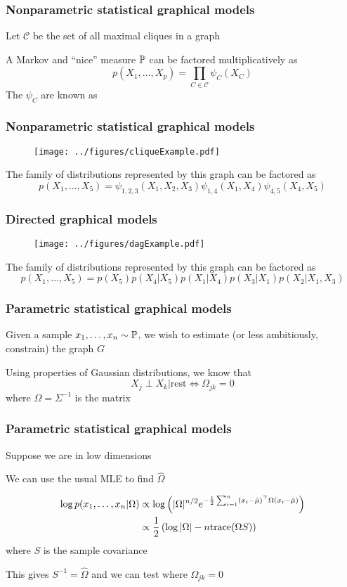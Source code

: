 \documentclass[12pt]{beamer}
\begin{document}
\begin{frame}[fragile]
\frametitle{Nonparametric statistical graphical models}
Let $\mathcal{C}$ be the set of all maximal cliques in a graph

\vsp
{} A Markov and ``nice'' measure $\P$ can be factored multiplicatively
as
\[
p(X_1,\ldots,X_p) = \prod_{C \in \mathcal{C}} \psi_C(X_C)
\]
The $\psi_C$ are known as 
\end{frame}

\begin{frame}[fragile]
\frametitle{Nonparametric statistical graphical models}
\begin{figure}
\centering
\texttt{[image: ../figures/cliqueExample.pdf]}
\end{figure}
The family of distributions represented by this graph can be factored as
\[
p(X_1,\ldots,X_5) = \psi_{1,2,3} (X_1,X_2,X_3)\psi_{1,4}(X_1,X_4)\psi_{4,5}(X_4,X_5)
\]
\end{frame}

\begin{frame}[fragile]
\frametitle{Directed graphical models}
\begin{figure}
\centering
\texttt{[image: ../figures/dagExample.pdf]}
\end{figure}
The family of distributions represented by this graph can be factored as
\[
p(X_1,\ldots,X_5) = p(X_5)p(X_4|X_5)p(X_1 | X_4) p(X_3 |X_1) p(X_2 | X_1,X_3)
\]

\end{frame}


\begin{frame}[fragile]
\frametitle{Parametric statistical graphical models}
 Given a sample $x_1,\ldots,x_n \sim \P$, we wish to estimate (or less ambitiously, constrain)
the graph $G$
\vsp

Using properties of Gaussian distributions, we know that
\[
X_j \perp X_k | \textrm{rest} \Leftrightarrow \Omega_{jk} = 0
\]
where $\Omega = \Sigma^{-1}$ is the  matrix
\end{frame}

\begin{frame}[fragile]
\frametitle{Parametric statistical graphical models}
Suppose we are in low dimensions 

\vsp

We can use the usual MLE to find $\hat\Omega$

\begin{align*}
\log p(x_1,\ldots,x_n|\Omega)
&  \propto \log \left( |\Omega|^{n/2} e^{ -\frac{1}{2} \sum_{i=1}^n (x_i - \hat\mu)^{\top}\Omega(x_i - \hat\mu)}\right)\\
&  \propto \frac{1}{2}\left( \log |\Omega| - n\tr(\Omega S)\right)
\end{align*}
where $S$ is the sample covariance

\vsp
This gives $S^{-1} = \hat\Omega$ and we can test where $\Omega_{jk} = 0$
\end{frame}
\end{document}
